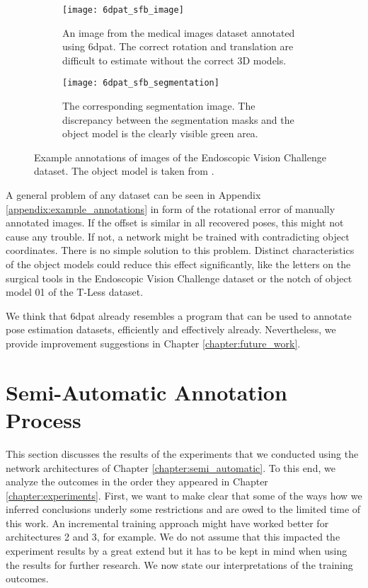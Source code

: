 \begin{figure}
	\begin{subfigure}[t]{0.47\textwidth}
		\centering
    	\texttt{[image: 6dpat\_sfb\_image]}
    	\caption{An image from the medical images dataset annotated using \ac{6dpat}. The correct rotation and translation are difficult to estimate without the correct 3D models.}
    	\label{fig:6dpat_sfb_image}
	\end{subfigure} 
	\hfill
	\begin{subfigure}[t]{0.47\textwidth}
		\centering
    	\texttt{[image: 6dpat\_sfb\_segmentation]}
    	\caption{The corresponding segmentation image. The discrepancy between the segmentation masks and the object model is the clearly visible green area.}
    	\label{fig:6dpat_sfb_segmentation}
	\end{subfigure} 
	\caption{Example annotations of images of the Endoscopic Vision Challenge dataset. The object model is taken from \cite{3d_scalpel_online}.}
	\label{fig:6dpat_sfb}
\end{figure} 

A general problem of any dataset can be seen in Appendix \ref{appendix:example_annotations} in form of the rotational error of manually annotated images. If the offset is similar in all recovered poses, this might not cause any trouble. If not, a network might be trained with contradicting object coordinates. There is no simple solution to this problem. Distinct characteristics of the object models could reduce this effect significantly, like the letters on the surgical tools in the Endoscopic Vision Challenge dataset or the notch of object model 01 of the T-Less dataset.

We think that \ac{6dpat} already resembles a program that can be used to annotate pose estimation datasets, efficiently and effectively already. Nevertheless, we provide improvement suggestions in Chapter \ref{chapter:future_work}.

\section{Semi-Automatic Annotation Process}

This section discusses the results of the experiments that we conducted using the network architectures of Chapter \ref{chapter:semi_automatic}. To this end, we analyze the outcomes in the order they appeared in Chapter \ref{chapter:experiments}. First, we want to make clear that some of the ways how we inferred conclusions underly some restrictions and are owed to the limited time of this work. An incremental training approach might have worked better for architectures 2 and 3, for example. We do not assume that this impacted the experiment results by a great extend but it has to be kept in mind when using the results for further research. We now state our interpretations of the training outcomes.

